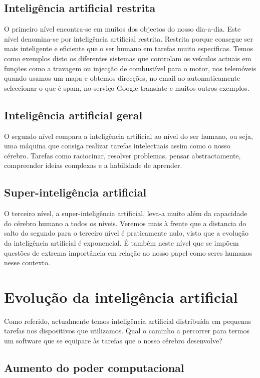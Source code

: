 \documentclass[runningheads,a4paper]{llncs}
\begin{document}
\subsection{Inteligência artificial restrita}
O primeiro nível encontra-se em muitos dos objectos do nosso dia-a-dia. Este nível denomina-se por inteligência artificial restrita. Restrita porque consegue ser mais inteligente e eficiente que o ser humano em tarefas muito especificas.
Temos como exemplos disto os diferentes sistemas que controlam os veículos actuais em funções como a travagem ou injecção de combustível para o motor, nos telemóveis quando usamos um mapa e obtemos direcções, no email ao automaticamente seleccionar o que é spam, no serviço Google translate e muitos outros exemplos.

\subsection{Inteligência artificial geral}
O segundo nível compara a inteligência artificial ao nível do ser humano, ou seja, uma máquina que consiga realizar tarefas intelectuais assim como o nosso cérebro. Tarefas como raciocinar, resolver problemas, pensar abstractamente, compreender ideias complexas e a habilidade de aprender.

\subsection{Super-inteligência artificial}
O terceiro nível, a super-inteligência artificial, leva-a muito além da capacidade do cérebro humano a todos os níveis. Veremos mais à frente que a distancia do salto do segundo para o terceiro nível é praticamente nulo, visto que a evolução da inteligência artificial é exponencial. É também neste nível que se impõem questões de extrema importância em relação ao nosso papel como seres humanos nesse contexto.

\section{Evolução da inteligência artificial}

Como referido, actualmente temos inteligência artificial distribuída em pequenas tarefas nos dispositivos que utilizamos. Qual o caminho a percorrer para termos um software que se equipare às tarefas que o nosso cérebro desenvolve?

\subsection{Aumento do poder computacional}
\end{document}
